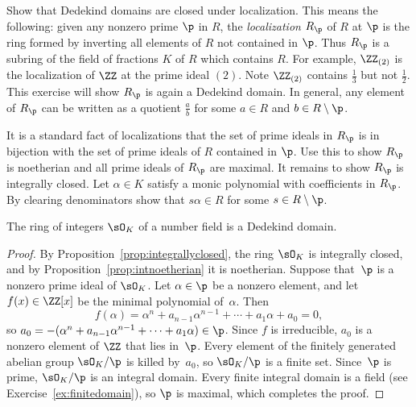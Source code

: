 \begin{exercise}\label{ex:dedekindlocal}
  Show that Dedekind domains are closed under
  localization. This means the following: given
  any nonzero prime $\p$ in $R$, the \emph{localization}
  $R_{\p}$ of $R$ at $\p$ is the ring formed by inverting all
  elements of $R$ not contained in $\p$. Thus $R_{\p}$ is a
  subring of the field of fractions $K$ of $R$ which contains
  $R$. For example, $\ZZ_{(2)}$ is the localization of $\ZZ$
  at the prime ideal $(2)$. Note $\ZZ_{(2)}$ contains
  $\frac{1}{3}$ but not $\frac{1}{2}$.
  This exercise will show $R_{\p}$ is again a Dedekind domain.
  In general, any element of $R_{\p}$ can be written as a quotient
  $\frac{a}{b}$ for some $a\in R$ and $b\in R\setminus \p$.

  \begin{hint}
    It is a standard fact of localizations that the
    set of prime ideals in $R_{\p}$ is in bijection with the set
    of prime ideals of $R$ contained in $\p$. Use this to show
    $R_{\p}$ is noetherian and all prime ideals of $R_{\p}$ are maximal.
    It remains to show $R_{\p}$ is integrally closed. Let $\alpha\in K$
    satisfy a monic polynomial with coefficients in $R_{\p}$. By
    clearing denominators show that $s\alpha\in R$ for some
    $s\in R\setminus \p$.
  \end{hint}
\end{exercise}

\begin{proposition}
  The ring of integers $\sO_K$ of a number field is a Dedekind domain.
\end{proposition}
\begin{proof}
  By Proposition~\ref{prop:integrallyclosed}, the ring $\sO_K$ is
  integrally closed, and by Proposition~\ref{prop:intnoetherian} it is
  noetherian.  Suppose that~$\p$ is a nonzero prime ideal of $\sO_K$.
  Let $\alpha\in \p$ be a nonzero element, and let $f(x)\in\ZZ[x]$ be the
  minimal polynomial of~$\alpha$.  Then
  $$f(\alpha)=\alpha^n+a_{n-1}\alpha^{n-1}+\cdots+a_1\alpha+a_0=0,$$ so
  $a_0 = -(\alpha^n+a_{n-1}\alpha^{n-1}+\cdots+a_1\alpha)\in \p$.  Since
  $f$ is irreducible, $a_0$ is a nonzero element of $\ZZ$ that lies
  in~$\p$.  Every element of the finitely generated abelian group
  $\sO_K/\p$ is killed by~$a_0$, so $\sO_K/\p$ is a finite set.
  Since~$\p$ is prime, $\sO_K/\p$ is an integral domain.  Every finite
  integral domain is a field (see Exercise~\ref{ex:finitedomain}), so
  $\p$ is maximal, which completes the proof.
\end{proof}


